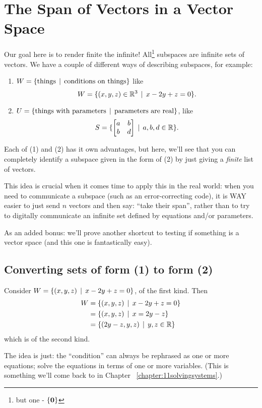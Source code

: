\chapter{The Span of Vectors in a Vector Space} \label{Chapter:06span}

 
Our goal here is to render finite the infinite!  All\footnote{but one - $\{\mathbf{0} \}$}   subspaces are infinite sets of vectors.  We have a couple
of different ways of describing subspaces, for example:
\begin{enumerate}
\item $W = \{ \textrm{things} \,\mid \, \textrm{conditions on things} \}$
like $$W = \{ (x,y,z) \in \mathbb{R}^3\,\mid \, x -2y+ z=0\}.$$
\item $U = \{ \textrm{things with parameters} \,\mid \, \textrm{parameters are real}\}$,
like $$S = \{ \left[ \begin{matrix} a & b\\ b & d \end{matrix} \right] \,\mid \, a,b,d \in \mathbb{R}\}.$$
\end{enumerate}
Each of (1) and (2) has it own advantages, but here, we'll see
that you can completely identify a subspace given in the form
of (2) by just giving a \emph{finite} list of vectors.   

This idea is crucial when it comes time to apply this in the real
world:  when you need to communicate a subspace (such as an error-correcting
code), it is WAY easier
to just send $n$ vectors and then say: ``take their span'', rather
than to try to digitally communicate an infinite set defined by
equations and/or parameters.

As an added bonus:  we'll prove another shortcut to testing if
something is a vector space (and this one is fantastically easy).

\section{Converting sets of form (1) to form (2)}

\begin{myexample} Consider $W = \{ (x,y,z) \,\mid \, x -2y+ z=0\}$, of the first kind.
Then
\begin{align*}
W &= \{ (x,y,z) \,\mid \, x -2y+ z=0\}\\
&= \{ (x,y,z) \,\mid \, x = 2y-z \}\\
&= \{ (2y-z,y,z) \,\mid \, y,z \in \mathbb{R}\}
\end{align*}
which is of the second kind.  \end{myexample}

The idea is just:  the ``condition'' can always be rephrased as
one or more equations; solve the equations in terms of one or
more variables.  (This is something we'll come back to in Chapter  ~\ref{chapter:11solvingsystems}.)

